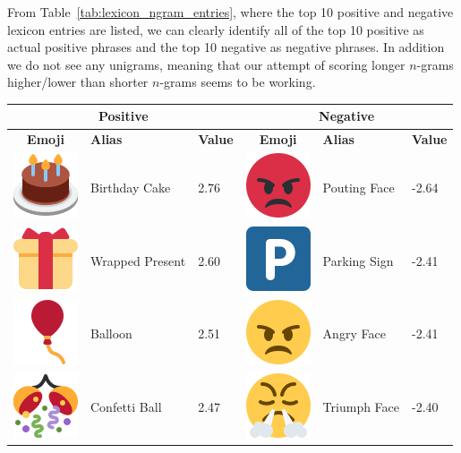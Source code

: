 From Table~\ref{tab:lexicon_ngram_entries}, where the top 10 positive and negative lexicon entries are listed, we can clearly identify all of the top 10 positive as actual positive phrases and the top 10 negative as negative phrases. In addition we do not see any unigrams, meaning that our attempt of scoring longer $n$-grams higher/lower than shorter $n$-grams seems to be working.  \\

\begin{table}[t]
    \begin{tabular}{| c | l | l || c | l | l |}
        \hline
        \multicolumn{3}{|c||}{\textbf{Positive}} & \multicolumn{3}{c|}{\textbf{Negative}} \\ \hline
        \textbf{Emoji} & \textbf{Alias} & \textbf{Value} & \textbf{Emoji} & \textbf{Alias} & \textbf{Value} \\ \hline
        \includegraphics[height=.5cm]{./figs/emojis/birthday} & Birthday Cake & 2.76 
        & \includegraphics[height=.5cm]{./figs/emojis/rage} & Pouting Face & -2.64 \\ \hline
        \includegraphics[height=.5cm]{./figs/emojis/gift} & Wrapped Present & 2.60 
        & \includegraphics[height=.5cm]{./figs/emojis/parking} & Parking Sign & -2.41 \\ \hline
        \includegraphics[height=.5cm]{./figs/emojis/balloon} & Balloon & 2.51 
        & \includegraphics[height=.5cm]{./figs/emojis/angry} & Angry Face & -2.41 \\ \hline
        \includegraphics[height=.5cm]{./figs/emojis/confetti_ball} & Confetti Ball & 2.47 
        & \includegraphics[height=.5cm]{./figs/emojis/triumph} & Triumph Face & -2.40 \\ \hline

\end{tabular}
\end{table}
